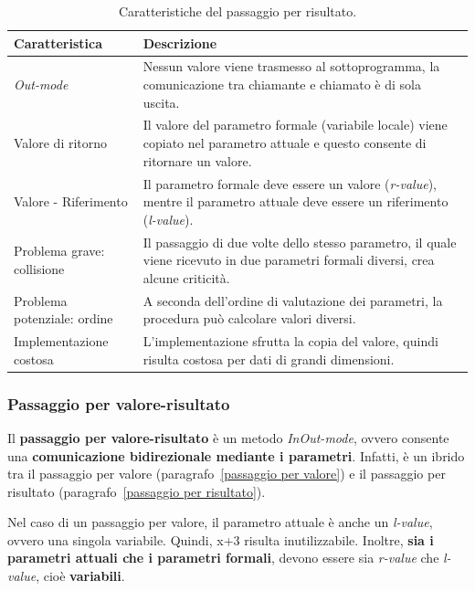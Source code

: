 \documentclass[a4paper]{article}
\begin{document}
	\begin{table}[!htbp]
		\centering
		\begin{tabular}{@{} l p{18em} @{}}
			\toprule
			Caratteristica 	& Descrizione \\
			\midrule
			\emph{Out-mode} 			& Nessun valore viene trasmesso al sottoprogramma, la comunicazione tra chiamante e chiamato è di sola uscita. \\ [0.5em]
			Valore di ritorno			& Il valore del parametro formale (variabile locale) viene copiato nel parametro attuale e questo consente di ritornare un valore. \\ [0.5em]
			Valore - Riferimento		& Il parametro formale deve essere un valore (\emph{r-value}), mentre il parametro attuale deve essere un riferimento (\emph{l-value}). \\ [0.5em]
			Problema grave: collisione 	& Il passaggio di due volte dello stesso parametro, il quale viene ricevuto in due parametri formali diversi, crea alcune criticità. \\ [0.5em]
			Problema potenziale: ordine	& A seconda dell'ordine di valutazione dei parametri, la procedura può calcolare valori diversi. \\ [0.5em]
			Implementazione costosa		& L'implementazione sfrutta la copia del valore, quindi risulta costosa per dati di grandi dimensioni. \\
			\bottomrule
		\end{tabular}
		\caption{Caratteristiche del passaggio per risultato.}
	\end{table}\newpage
	
	\subsubsection{Passaggio per valore-risultato}
	
	Il \textcolor{Red3}{\textbf{passaggio per valore-risultato}} è un metodo \emph{InOut-mode}, ovvero consente una \textbf{comunicazione bidirezionale mediante i parametri}. Infatti, è un ibrido tra il passaggio per valore (paragrafo~\ref{passaggio per valore}) e il passaggio per risultato (paragrafo~\ref{passaggio per risultato}).\newline
	
	\noindent
	Nel caso di un passaggio per valore, il parametro attuale è anche un \emph{l-value}, ovvero una singola variabile. Quindi, \textsf{x+3} risulta inutilizzabile. Inoltre, \textbf{sia i parametri attuali che i parametri formali}, devono essere sia \emph{r-value} che \emph{l-value}, cioè \textbf{variabili}.\newline
	
\end{document}
